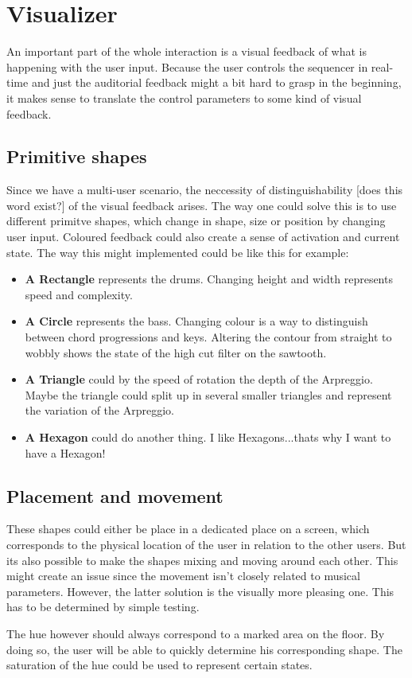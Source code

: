 \documentclass[titlepage, a4paper, 11pt]{scrartcl}
\begin{document}
\section{Visualizer}

An important part of the whole interaction is a visual feedback of what is happening with the user input. Because the user 
controls the sequencer in real-time and just the auditorial feedback might a bit hard to grasp in the beginning, it makes sense to 
translate the control parameters to some kind of visual feedback.


\subsection{Primitive shapes}

Since we have a multi-user scenario, the neccessity of distinguishability [does this word exist?] of the visual feedback arises.
The way one could solve this is to use different primitve shapes, which change in shape, size or position by changing user input.
Coloured feedback could also create a sense of activation and current state. 
The way this might implemented could be like this for example:

\begin{itemize}
    \item \textbf{A Rectangle} represents the drums. Changing height and width represents speed and complexity.
    \item \textbf{A Circle} represents the bass. Changing colour is a way to distinguish between chord progressions and keys. Altering the contour from straight to wobbly shows the state of the high cut filter on the sawtooth.
    \item \textbf{A Triangle} could by the speed of rotation the depth of the Arpreggio. Maybe the triangle could split up in several smaller triangles and represent the variation of the Arpreggio.
    \item \textbf{A Hexagon} could do another thing. I like Hexagons...thats why I want to have a Hexagon!
\end{itemize}

\subsection{Placement and movement}

These shapes could either be place in a dedicated place on a screen, which corresponds to the physical location of the user in relation to the other users.
But its also possible to make the shapes mixing and moving around each other. This might create an issue since the movement isn't closely related to musical parameters.
However, the latter solution is the visually more pleasing one. This has to be determined by simple testing.

The hue however should always correspond to a marked area on the floor. By doing so, the user will be able to quickly determine his corresponding shape.
The saturation of the hue could be used to represent certain states.
\end{document}
